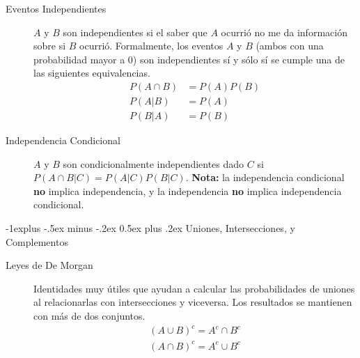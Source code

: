 \documentclass[12,landscape]{article}
\makeatletter
\renewcommand{\subsection}{\@startsection{subsection}{2}{0mm}%
                                {-1explus -.5ex minus -.2ex}%
                                {0.5ex plus .2ex}%
                                {\normalfont\normalsize\bfseries}}
\makeatother
\begin{document}
\begin{multicols*}{3}
    \begin{description}
        \item[Eventos Independientes] $A$ y $B$ son independientes si el saber que $A$ ocurrió no me da información sobre si $B$ ocurrió. Formalmente, los eventos $A$ y $B$ (ambos con una probabilidad mayor a $0$) son independientes sí y sólo sí se cumple una de las siguientes equivalencias.
           \begin{align*} 
            P({A}\cap { B}) &= P({A})P({B}) \\
            P({ A}|{ B}) &= P({A})\\
            P(B|A) &= P(B)
           \end{align*}
        \item[Independencia Condicional] $A$ y $B$ son condicionalmente independientes dado $C$ si $P(A \cap B | C) = P(A|C)P(B|C)$. \textbf{Nota:} la independencia condicional \textbf{no} implica independencia, y la independencia \textbf{no} implica independencia condicional.
    \end{description}
    
\subsection{Uniones, Intersecciones, y Complementos}

    \begin{description}

        \item[Leyes de De Morgan] Identidades muy útiles que ayudan a calcular las probabilidades de uniones al relacionarlas con intersecciones y viceversa. Los resultados se mantienen con más de dos conjuntos.
           \begin{align*} 
        ({A} \cup { B})^c = {A^c} \cap { B^c} \\
        ({A} \cap {B})^c = { A^c} \cup { B^c}
           \end{align*} 
                  


\end{description}
\end{multicols*}
\end{document}
